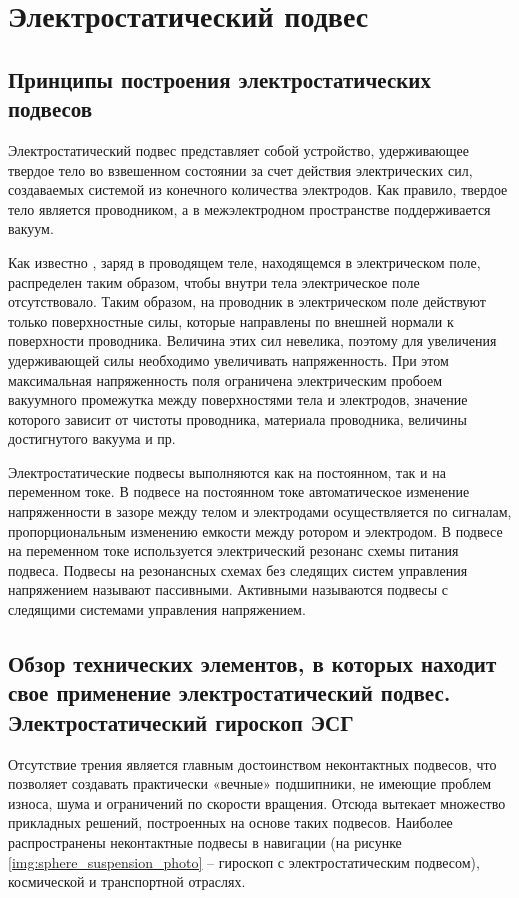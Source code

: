 \chapter{Электростатический подвес} \label{chapt1}


\section{Принципы построения электростатических подвесов} \label{sect1_1}

Электростатический подвес представляет собой устройство, удерживающее твердое тело во взвешенном состоянии за счет действия электрических сил, создаваемых системой из конечного количества электродов. Как правило, твердое тело является проводником, а в межэлектродном пространстве поддерживается вакуум.

Как известно \cite{Tamm}, заряд в проводящем теле, находящемся в электрическом поле, распределен таким образом, чтобы внутри тела электрическое поле отсутствовало. Таким образом, на проводник в электрическом поле действуют только поверхностные силы, которые направлены по внешней нормали к поверхности проводника. Величина этих сил невелика, поэтому для увеличения удерживающей силы необходимо увеличивать напряженность. При этом максимальная напряженность поля ограничена электрическим пробоем вакуумного промежутка между поверхностями тела и электродов, значение которого зависит от чистоты проводника, материала проводника, величины достигнутого вакуума и пр.

Электростатические подвесы выполняются как на постоянном, так и на переменном токе. В подвесе на постоянном токе автоматическое изменение напряженности в зазоре между телом и электродами осуществляется по сигналам, пропорциональным изменению емкости между ротором и электродом. В подвесе на переменном токе используется электрический резонанс схемы питания подвеса. Подвесы на резонансных схемах без следящих систем управления напряжением называют пассивными. Активными называются подвесы с следящими системами управления напряжением.


\section{Обзор технических элементов, в которых находит свое применение электростатический подвес. Электростатический гироскоп ЭСГ} \label{sect1_2}
Отсутствие трения является главным достоинством неконтактных подвесов, что позволяет создавать практически «вечные» подшипники, не имеющие проблем износа, шума и ограничений по скорости вращения. Отсюда вытекает множество прикладных решений, построенных на основе таких подвесов. Наиболее распространены неконтактные подвесы в навигации (на рисунке \ref{img:sphere_suspension_photo} – гироскоп с электростатическим подвесом), космической и транспортной отраслях.

